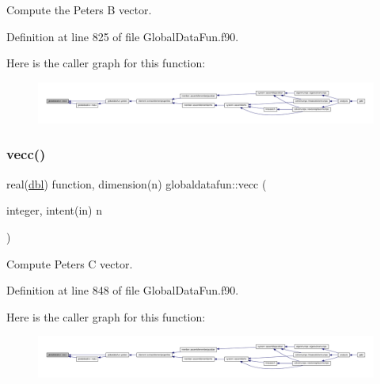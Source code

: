 Compute the Peters B vector. 



Definition at line 825 of file Global\+Data\+Fun.\+f90.

Here is the caller graph for this function\+:\nopagebreak
\begin{figure}[H]
\begin{center}
\leavevmode
\includegraphics[width=350pt]{namespaceglobaldatafun_a0ef3145b88a5e2f7679e5309ed885bc4_icgraph}
\end{center}
\end{figure}
\mbox{\label{namespaceglobaldatafun_ac274536794b3306528c0130a20080b15}} 
\subsubsection{\texorpdfstring{vecc()}{vecc()}}
{\footnotesize\ttfamily real(\hyperlink{namespaceglobaldatafun_a5008801201dd34f2af8eae07756befb4}{dbl}) function, dimension(n) globaldatafun\+::vecc (\begin{DoxyParamCaption}\item[{integer, intent(in)}]{n }\end{DoxyParamCaption})\hspace{0.3cm}{\ttfamily [private]}}



Compute Peters C vector. 



Definition at line 848 of file Global\+Data\+Fun.\+f90.

Here is the caller graph for this function\+:\nopagebreak
\begin{figure}[H]
\begin{center}
\leavevmode
\includegraphics[width=350pt]{namespaceglobaldatafun_ac274536794b3306528c0130a20080b15_icgraph}
\end{center}
\end{figure}
\mbox{\label{namespaceglobaldatafun_a71653a1d825c3dee70490c228d23b738}} 
